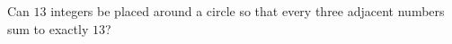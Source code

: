 Can $13$ integers be placed around a circle so that every three adjacent numbers sum to exactly $13$?
